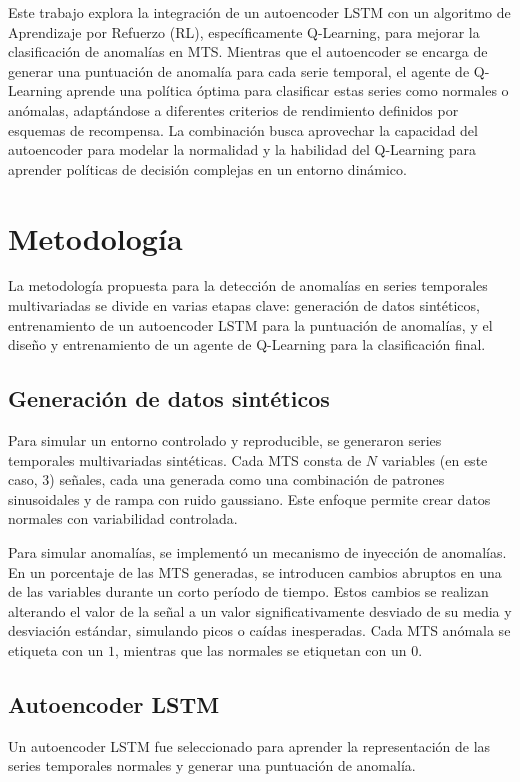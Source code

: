 \documentclass[12pt]{article}
\begin{document}
Este trabajo explora la integración de un autoencoder LSTM con un algoritmo de Aprendizaje por Refuerzo (RL), específicamente Q-Learning, para mejorar la clasificación de anomalías en MTS.
Mientras que el autoencoder se encarga de generar una puntuación de anomalía para cada serie temporal, el agente de Q-Learning aprende una política óptima para clasificar estas series como normales o anómalas, adaptándose a diferentes criterios de rendimiento definidos por esquemas de recompensa.
La combinación busca aprovechar la capacidad del autoencoder para modelar la normalidad y la habilidad del Q-Learning para aprender políticas de decisión complejas en un entorno dinámico.


\bigskip
\section{Metodología}
\label{sec:metodologia}

La metodología propuesta para la detección de anomalías en series temporales multivariadas se divide en varias etapas clave: generación de datos sintéticos, entrenamiento de un autoencoder LSTM para la puntuación de anomalías, y el diseño y entrenamiento de un agente de Q-Learning para la clasificación final.

\subsection{Generación de datos sintéticos}
Para simular un entorno controlado y reproducible, se generaron series temporales multivariadas sintéticas.
Cada MTS consta de $N$ variables (en este caso, $3$) señales, cada una generada como una combinación de patrones sinusoidales y de rampa con ruido gaussiano.
Este enfoque permite crear datos normales con variabilidad controlada.

Para simular anomalías, se implementó un mecanismo de inyección de anomalías.
En un porcentaje de las MTS generadas, se introducen cambios abruptos en una de las variables durante un corto período de tiempo.
Estos cambios se realizan alterando el valor de la señal a un valor significativamente desviado de su media y desviación estándar, simulando picos o caídas inesperadas.
Cada MTS anómala se etiqueta con un $1$, mientras que las normales se etiquetan con un $0$.

\subsection{Autoencoder LSTM}
Un autoencoder LSTM fue seleccionado para aprender la representación de las series temporales normales y generar una puntuación de anomalía.
\end{document}
